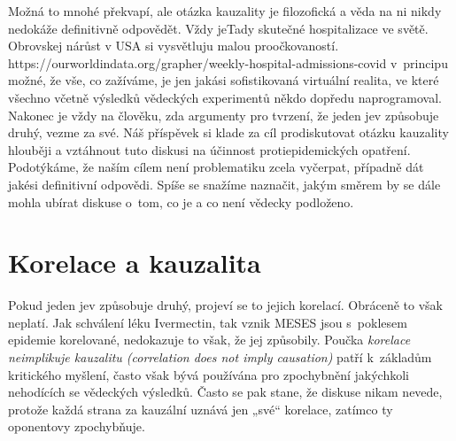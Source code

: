 Možná to mnohé překvapí, ale otázka kauzality je filozofická a věda na ni nikdy nedokáže definitivně odpovědět. Vždy jeTady skutečné hospitalizace ve světě. Obrovskej nárůst v USA si vysvětluju malou proočkovaností. https://ourworldindata.org/grapher/weekly-hospital-admissions-covid
v~principu možné, že vše, co zažíváme, je jen jakási sofistikovaná
virtuální realita, ve které všechno včetně výsledků vědeckých experimentů
někdo dopředu naprogramoval. Nakonec je vždy na člověku, zda argumenty
pro tvrzení, že jeden jev způsobuje druhý, vezme za své. Náš příspěvek
si klade za cíl prodiskutovat otázku kauzality hlouběji a vztáhnout
tuto diskusi na účinnost
protiepidemických opatření. Podotýkáme, že naším cílem není problematiku
zcela vyčerpat, případně dát jakési definitivní odpovědi. Spíše se snažíme
naznačit, jakým směrem by se dále mohla ubírat diskuse o~tom, co je
a co není vědecky podloženo.

\section*{Korelace a kauzalita}

Pokud jeden jev způsobuje druhý, projeví se to jejich korelací. Obráceně to však neplatí. Jak schválení léku Ivermectin, tak vznik MESES jsou s~poklesem epidemie korelované, nedokazuje to však, že jej způsobily. Poučka {\em korelace neimplikuje kauzalitu (correlation does not imply causation)} patří k~základům kritického myšlení, často však bývá používána pro zpochybnění jakýchkoli nehodících se vědeckých výsledků. Často se pak stane, že diskuse nikam nevede, protože každá strana za kauzální uznává jen „své“ korelace, zatímco ty oponentovy zpochybňuje.


